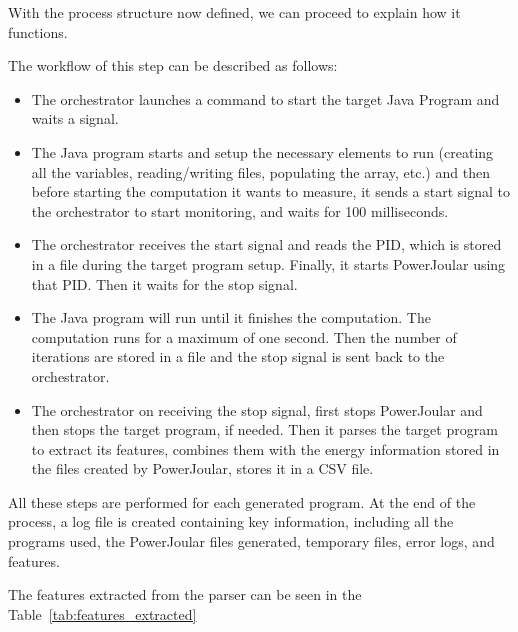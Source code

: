 With the process structure now defined, we can proceed to explain how it functions.

The workflow of this step can be described as follows:

\begin{itemize}
  \item The orchestrator launches a command to start the target Java Program and waits a signal.
  \item The Java program starts and setup the necessary elements to run (creating all the variables, reading/writing files, populating the array, etc.) and then before starting the computation it wants to measure, it sends a start signal to the orchestrator to start monitoring, and waits for 100 milliseconds.
  \item The orchestrator receives the start signal and reads the PID, which is stored in a file during the target program setup. Finally, it starts PowerJoular using that PID. Then it waits for the stop signal.
  \item The Java program will run until it finishes the computation. The computation runs for a maximum of one second. Then the number of iterations are stored in a file and the stop signal is sent back to the orchestrator.
  \item The orchestrator on receiving the stop signal, first stops PowerJoular and then stops the target program, if needed. Then it parses the target program to extract its features, combines them with the energy information stored in the files created by PowerJoular, stores it in a CSV file.
\end{itemize}

All these steps are performed for each generated program. At the end of the process, a log file is created containing key information, including all the programs used, the PowerJoular files generated, temporary files, error logs, and features.

The features extracted from the parser can be seen in the Table~\ref{tab:features_extracted}

